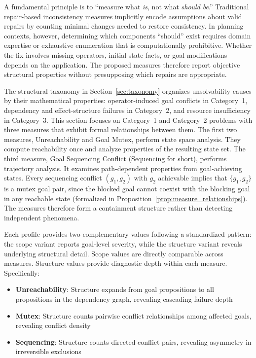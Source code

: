 A fundamental principle is to ``measure what \emph{is}, not what \emph{should be}.'' Traditional repair-based inconsistency measures implicitly encode assumptions about valid repairs by counting minimal changes needed to restore consistency. In planning contexts, however, determining which components ``should'' exist requires domain expertise or exhaustive enumeration that is computationally prohibitive. Whether the fix involves missing operators, initial state facts, or goal modifications depends on the application. The proposed measures therefore report objective structural properties without presupposing which repairs are appropriate.

The structural taxonomy in Section~\ref{sec:taxonomy} organizes unsolvability causes by their mathematical properties: operator-induced goal conflicts in Category~1, dependency and effect-structure failures in Category~2, and resource insufficiency in Category~3. This section focuses on Category~1 and Category~2 problems with three measures that exhibit formal relationships between them. The first two measures, Unreachability and Goal Mutex, perform state space analysis. They compute reachability once and analyze properties of the resulting state set. The third measure, Goal Sequencing Conflict (Sequencing for short), performs trajectory analysis. It examines path-dependent properties from goal-achieving states. Every sequencing conflict $(g_1, g_2)$ with $g_2$ achievable implies that $\{g_1, g_2\}$ is a mutex goal pair, since the blocked goal cannot coexist with the blocking goal in any reachable state (formalized in Proposition~\ref{prop:measure_relationships}). The measures therefore form a containment structure rather than detecting independent phenomena.

Each profile provides two complementary values following a standardized pattern: the scope variant reports goal-level severity, while the structure variant reveals underlying structural detail. Scope values are directly comparable across measures. Structure values provide diagnostic depth within each measure. Specifically:
\begin{itemize}
    \item \textbf{Unreachability}: Structure expands from goal propositions to all propositions in the dependency graph, revealing cascading failure depth
    \item \textbf{Mutex}: Structure counts pairwise conflict relationships among affected goals, revealing conflict density
    \item \textbf{Sequencing}: Structure counts directed conflict pairs, revealing asymmetry in irreversible exclusions
\end{itemize}
